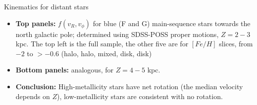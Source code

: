 \documentclass[letterpaper,landscape]{slides}
\begin{document}
\begin{slide}
{\begin{minipage}[t]{11cm}
\begin{center}
\end{center}
\end{minipage}

\begin{minipage}[t]{12.5cm}
\begin{center}
\vskip -1in
{\large \color{red} Kinematics for distant stars }
\end{center}

\begin{itemize}
\item {\bf Top panels:} $f(v_R, v_\phi)$ for blue (F and G) main-sequence
      stars towards the north galactic pole; determined using SDSS-POSS
      proper motions, $Z=2-3$ kpc. The top left is the full sample, 
      the other five are for $[Fe/H]$ slices, from $-2$ to $> -0.6$
      (halo, halo, mixed, disk, disk)
\item {\bf Bottom panels:} analogous, for $Z=4-5$ kpc.
\item {\color{blue} {\bf Conclusion:} High-metallicity stars have net
      rotation (the median velocity depends on $Z$), low-metallicity
      stars are consistent with no rotation. }
\end{itemize}     

\end{minipage}}
\vfill 
\end{slide}
\end{document}
